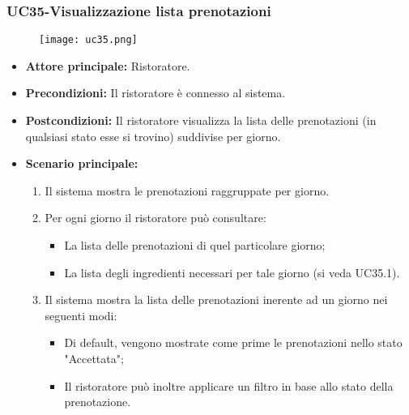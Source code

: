 \subsubsection{UC35-Visualizzazione lista prenotazioni}
\begin{figure}[h] \texttt{[image: uc35.png]} \end{figure}
\begin{itemize}
\item \textbf{Attore principale:} Ristoratore.
\item \textbf{Precondizioni:} Il ristoratore è connesso al sistema.
\item \textbf{Postcondizioni:} Il ristoratore visualizza la lista delle prenotazioni (in qualsiasi stato esse si trovino) suddivise per giorno.
\item \textbf{Scenario principale:}
\begin{enumerate}
    \item Il sistema mostra le prenotazioni raggruppate per giorno.
    \item Per ogni giorno il ristoratore può consultare:
    \begin{itemize}
        \item La lista delle prenotazioni di quel particolare giorno;
        \item La lista degli ingredienti necessari per tale giorno (si veda UC35.1).
    \end{itemize}
    \item Il sistema mostra la lista delle prenotazioni inerente ad un giorno nei seguenti modi:
    \begin{itemize}
        \item Di default, vengono mostrate come prime le prenotazioni nello stato "Accettata";
        \item Il ristoratore può inoltre applicare un filtro in base allo stato della prenotazione.
    \end{itemize}
\end{enumerate}
\end{itemize}

